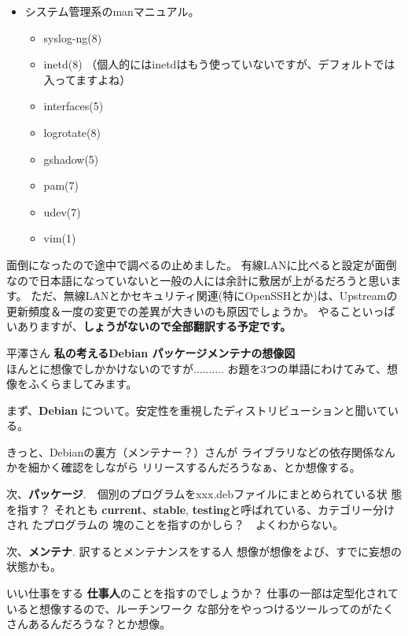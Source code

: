 \documentclass[cjk,dvipdfmx,12pt]{beamer}
\begin{document}
\begin{frame}
\begin{itemize}
  \item システム管理系のmanマニュアル。
    \begin{itemize}
      \item syslog-ng(8)
      \item inetd(8) （個人的にはinetdはもう使っていないですが、デフォルトでは入ってますよね）
      \item interfaces(5)
      \item logrotate(8)
      \item gshadow(5)
      \item pam(7)
      \item udev(7)
      \item vim(1)
    \end{itemize}
\end{itemize}
面倒になったので途中で調べるの止めました。
有線LANに比べると設定が面倒なので日本語になっていないと一般の人には余計に敷居が上がるだろうと思います。
ただ、無線LANとかセキュリティ関連(特にOpenSSHとか)は、Upstreamの更新頻度＆一度の変更での差異が大きいのも原因でしょうか。
やることいっぱいありますが、\textbf{しょうがないので全部翻訳する予定です。}

\end{frame}

\begin{frame}{平澤さん}
\textbf{私の考えるDebian パッケージメンテナの想像図}\\
ほんとに想像でしかかけないのですが..........
お題を3つの単語にわけてみて、想像をふくらましてみます。

まず、{\bf Debian} について。安定性を重視したディストリビューションと聞いている。

きっと、Debianの裏方（メンテナー？）さんが
ライブラリなどの依存関係なんかを細かく確認をしながら
リリースするんだろうなぁ、とか想像する。

次、{\bf パッケージ}.　個別のプログラムをxxx.debファイルにまとめられている状
態を指す？
それとも {\bf current}、{\bf stable}, {\bf testing}と呼ばれている、カテゴリー分けされ
たプログラムの
塊のことを指すのかしら？　よくわからない。
\end{frame}

\begin{frame}
次、{\bf メンテナ}. 訳するとメンテナンスをする人
想像が想像をよび、すでに妄想の状態かも。

いい仕事をする {\bf 仕事人}のことを指すのでしょうか？
仕事の一部は定型化されていると想像するので、ルーチンワーク
な部分をやっつけるツールってのがたくさんあるんだろうな？とか想像。
\end{frame}
\end{document}

